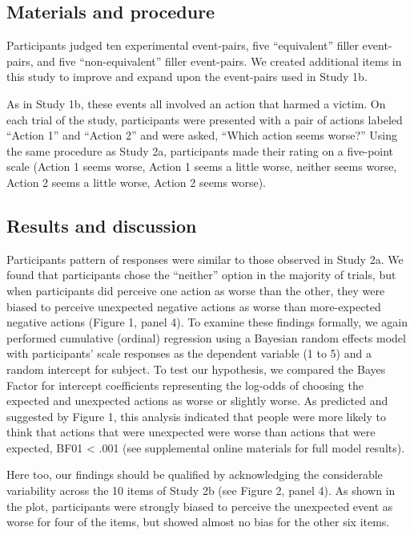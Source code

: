 \documentclass[10pt, letterpaper]{article}
\begin{document}
\subsection{Materials and procedure}\label{materials-and-procedure-3}

Participants judged ten experimental event-pairs, five ``equivalent''
filler event-pairs, and five ``non-equivalent'' filler event-pairs. We
created additional items in this study to improve and expand upon the
event-pairs used in Study 1b.

As in Study 1b, these events all involved an action that harmed a
victim. On each trial of the study, participants were presented with a
pair of actions labeled ``Action 1'' and ``Action 2'' and were asked,
``Which action seems worse?'' Using the same procedure as Study 2a,
participants made their rating on a five-point scale (Action 1 seems
worse, Action 1 seems a little worse, neither seems worse, Action 2
seems a little worse, Action 2 seems worse).

\subsection{Results and discussion}\label{results-and-discussion-3}

Participants pattern of responses were similar to those observed in
Study 2a. We found that participants chose the ``neither'' option in the
majority of trials, but when participants did perceive one action as
worse than the other, they were biased to perceive unexpected negative
actions as worse than more-expected negative actions (Figure 1, panel
4). To examine these findings formally, we again performed cumulative
(ordinal) regression using a Bayesian random effects model with
participants' scale responses as the dependent variable (1 to 5) and a
random intercept for subject. To test our hypothesis, we compared the
Bayes Factor for intercept coefficients representing the log-odds of
choosing the expected and unexpected actions as worse or slightly worse.
As predicted and suggested by Figure 1, this analysis indicated that
people were more likely to think that actions that were unexpected were
worse than actions that were expected, BF01 \textless{} .001 (see
supplemental online materials for full model results).

Here too, our findings should be qualified by acknowledging the
considerable variability across the 10 items of Study 2b (see Figure 2,
panel 4). As shown in the plot, participants were strongly biased to
perceive the unexpected event as worse for four of the items, but showed
almost no bias for the other six items.
\end{document}
